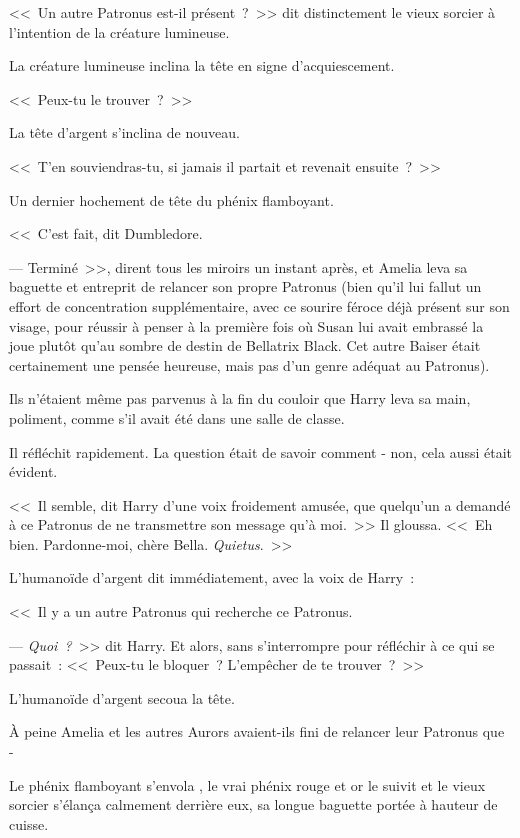 <<~Un autre Patronus est-il présent~?~>> dit distinctement le vieux sorcier à l'intention de la créature lumineuse.

La créature lumineuse inclina la tête en signe d'acquiescement.

<<~Peux-tu le trouver~?~>>

La tête d'argent s'inclina de nouveau.

<<~T'en souviendras-tu, si jamais il partait et revenait ensuite~?~>>

Un dernier hochement de tête du phénix flamboyant.

<<~C'est fait, dit Dumbledore.

--- Terminé~>>, dirent tous les miroirs un instant après, et Amelia leva sa baguette et entreprit de relancer son propre Patronus (bien qu'il lui fallut un effort de concentration supplémentaire, avec ce sourire féroce déjà présent sur son visage, pour réussir à penser à la première fois où Susan lui avait embrassé la joue plutôt qu'au sombre de destin de Bellatrix Black. Cet autre Baiser était certainement une pensée heureuse, mais pas d'un genre adéquat au Patronus).

\later

Ils n'étaient même pas parvenus à la fin du couloir que Harry leva sa main, poliment, comme s'il avait été dans une salle de classe.

Il réfléchit rapidement. La question était de savoir comment - non, cela aussi était évident.

<<~Il semble, dit Harry d'une voix froidement amusée, que quelqu'un a demandé à ce Patronus de ne transmettre son message qu'à moi.~>> Il gloussa. <<~Eh bien. Pardonne-moi, chère Bella. \emph{Quietus}.~>>

L'humanoïde d'argent dit immédiatement, avec la voix de Harry~:

<<~Il y a un autre Patronus qui recherche ce Patronus.

--- \emph{Quoi~?}~>> dit Harry. Et alors, sans s'interrompre pour réfléchir à ce qui se passait~: <<~Peux-tu le bloquer~? L'empêcher de te trouver~?~>>

L'humanoïde d'argent secoua la tête.

\later

À peine Amelia et les autres Aurors avaient-ils fini de relancer leur Patronus que -

Le phénix flamboyant s'envola , le vrai phénix rouge et or le suivit et le vieux sorcier s'élança calmement derrière eux, sa longue baguette portée à hauteur de cuisse.

